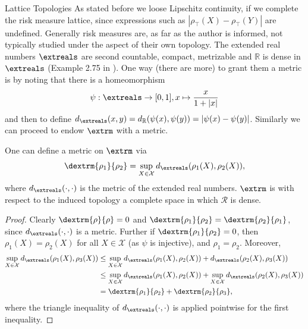\begin{subsection}{Lattice Topologies}
    As stated before we loose Lipschitz continuity, if we complete the risk measure lattice,
    since expressions such as \( | \rho_{\top}(X) - \rho_{\top}(Y) | \) are undefined.
    Generally risk measures are, as far as the author is informed, not typically studied under the aspect
    of their own topology. 
    \newline
    The extended real numbers \( \extreals \) are second countable, compact, metrizable and \( \mathbb{R} \) is dense in \( \extreals \) 
    (Example 2.75 in \cite{infinitedimanalysis}).
    One way (there are more) to grant them a metric is by noting that there is a homeomorphism 
    \[\psi : \extreals \to [0, 1], x \mapsto \frac{x}{1 + |x|} \]
    and then to define \( d_{\extreals}(x, y) = d_{\mathbb{R}}(\psi(x), \psi(y)) = |\psi(x) - \psi(y)| \).
    Similarly we can proceed to endow \( \extrm \) with a metric.
    \begin{theorem} \label{unifconvrm}
        One can define a metric on \( \extrm \) via
        \[
        \dextrm{\rho_1}{\rho_2} = \sup_{X \in \mathcal{X}} d_{\extreals}(\rho_1(X), \rho_2(X)),
        \]
        where \( d_{\extreals}(\cdot, \cdot) \) is the metric of the extended real numbers.
        \( \extrm \) is with respect to the induced topology a complete space 
        in which \( \mathcal{R} \) is dense.
    \end{theorem}
    \begin{proof}
    Clearly \( \dextrm{\rho}{\rho} = 0 \) and \( \dextrm{\rho_1}{\rho_2} = \dextrm{\rho_2}{\rho_1} \), since \( d_{\extreals}(\cdot, \cdot) \) is a metric.
    Further if \( \dextrm{\rho_1}{\rho_2} = 0 \), then \( \rho_1(X) = \rho_2(X) \) for all \( X \in \mathcal{X} \) (as \( \psi \) is injective),
        and \( \rho_1 = \rho_2 \). Moreover,
        \begin{align*}
            \sup_{X \in \mathcal{X}} d_{\extreals}(\rho_1(X), \rho_3(X)) 
            &\leq \sup_{X \in \mathcal{X}} d_{\extreals}(\rho_1(X), \rho_2(X)) + d_{\extreals}(\rho_2(X), \rho_3(X)) \\
            &\leq \sup_{X \in \mathcal{X}} d_{\extreals}(\rho_1(X), \rho_2(X)) + \sup_{X \in \mathcal{X}} d_{\extreals}(\rho_2(X), \rho_3(X)) \\
            &= \dextrm{\rho_1}{\rho_2} + \dextrm{\rho_2}{\rho_3},
        \end{align*}
            where the triangle inequality of \( d_{\extreals}(\cdot, \cdot) \) is applied pointwise for the first inequality.

\end{proof}
\end{subsection}
